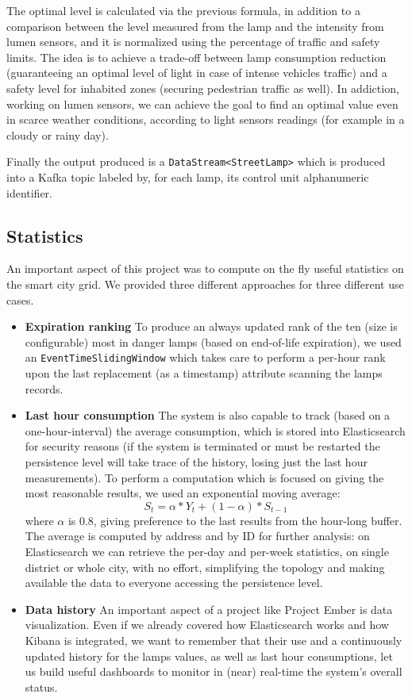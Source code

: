 	The optimal level is calculated via the previous formula, in addition to a comparison between the level measured from the lamp and the intensity from lumen sensors, and it is normalized using the percentage of traffic and safety limits. The idea is to achieve a trade-off between lamp consumption reduction (guaranteeing an optimal level of light in case of intense vehicles traffic) and a safety level for inhabited zones (securing pedestrian traffic as well). In addiction, working on lumen sensors, we can achieve the goal to find an optimal value even in scarce weather conditions, according to light sensors readings (for example in a cloudy or rainy day).

Finally the output produced is a \texttt{DataStream<StreetLamp>} which is produced into a Kafka topic labeled by, for each lamp, its control unit alphanumeric identifier.

\subsection*{Statistics}
An important aspect of this project was to compute on the fly useful statistics on the smart city grid. We provided three different approaches for three different use cases.
\begin{itemize}
	\item \textbf{Expiration ranking} To produce an always updated rank of the ten (size is configurable) most in danger lamps (based on end-of-life expiration), we used an \texttt{EventTimeSlidingWindow} which takes care to perform a per-hour rank upon the last replacement (as a timestamp) attribute scanning the lamps records.
	\item \textbf{Last hour consumption} The system is also capable to track (based on a one-hour-interval) the average consumption, which is stored into Elasticsearch for security reasons (if the system is terminated or must be restarted the persistence level will take trace of the history, losing just the last hour measurements). To perform a computation which is focused on giving the most reasonable results, we used an exponential moving average:
$$S_t = \alpha*Y_t + (1 - \alpha)*S_{t-1}$$
where $\alpha$ is 0.8, giving preference to the last results from the hour-long buffer. The average is computed by address and by ID for further analysis: on Elasticsearch we can retrieve the per-day and per-week statistics, on single district or whole city, with no effort, simplifying the topology and making available the data to everyone accessing the persistence level.
	\item \textbf{Data history} An important aspect of a project like Project Ember is data visualization. Even if we already covered how Elasticsearch works and how Kibana is integrated, we want to remember that their use and a continuously updated history for the lamps values, as well as last hour consumptions, let us build useful dashboards to monitor in (near) real-time the system's overall status.
\end{itemize}

